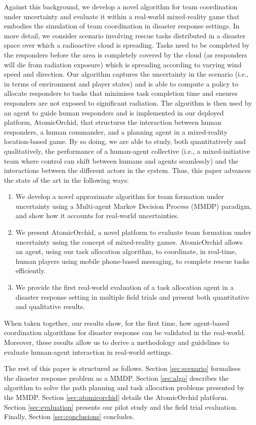 Against this background, we develop a novel algorithm for team coordination under uncertainty and evaluate it within a real-world mixed-reality game that embodies the simulation of team coordination in disaster response settings. In more detail, we consider scenario involving rescue tasks distributed in a disaster space over which a radioactive cloud is spreading. Tasks need to be completed by the responders before the area is completely covered by the cloud (as responders will die from radiation exposure) which is spreading according to varying wind speed and direction. Our algorithm captures the uncertainty in the scenario (i.e., in terms of environment and player states) and  is able to compute a policy to allocate responders to tasks that minimises task completion time and ensures responders are not exposed to significant radiation. The algorithm is then used by an agent to guide human responders and is  implemented in our deployed platform, AtomicOrchid, that structures the interaction between human responders, a human commander, and a planning agent in a mixed-reality location-based game. By so doing, we are able to study, both quantitatively and qualitatively, the performance of a human-agent collective (i.e., a mixed-initiative team where control can shift between humans and agents seamlessly)  and the interactions between the different actors in the system. Thus, this paper advances the state of the art in the following ways:
\begin{enumerate}
\item We develop a novel approximate algorithm for team formation under uncertainty using a Multi-agent Markov Decision Process (MMDP) paradigm, and show how it accounts for real-world uncertainties.
\item We present AtomicOrchid, a novel platform to evaluate team formation under uncertainty using the concept of mixed-reality games. AtomicOrchid allows an agent, using our task allocation algorithm, to coordinate, in real-time, human players using mobile phone-based messaging, to complete rescue tasks efficiently.
\item We provide the first real-world evaluation of a task allocation agent in a disaster response setting in multiple field trials and present both quantitative and qualitative results. 
\end{enumerate}
When taken together, our results show, for the first time, how agent-based coordination algorithms for disaster response can be validated in the real-world. Moreover, these results allow us to derive a methodology and guidelines to evaluate human-agent interaction in real-world settings. 

The rest of this paper is structured as follows. Section \ref{sec:scenario} formalises the disaster response problem as a MMDP. Section \ref{sec:algo}  describes the algorithm to solve the path planning and task allocation problems presented by the MMDP. Section \ref{sec:atomicorchid}  details the AtomicOrchid platform. Section \ref{sec:evaluation} presents our pilot study and the  field trial evaluation.  Finally, Section \ref{sec:conclusions} concludes.